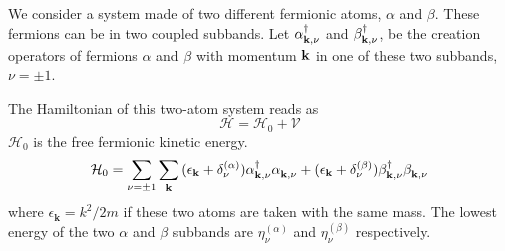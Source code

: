 \documentclass[11pt]{article} %
\begin{document}
We consider a system made of two different fermionic atoms, $\alpha$ and $\beta$.  These fermions can be in two coupled subbands. Let $\alpha^{\dagger}_{\mathbf{k}, \nu}$ and $\beta^{\dagger}_{\mathbf{k},\nu}$, be the creation operators of fermions $\alpha$ and $\beta$ with momentum $\mathbf{k}$ in one of these two subbands, $\nu=\pm1$. 

The Hamiltonian of this two-atom system reads as 
\begin{equation}\label{eq:H}
\mathcal{H}=\mathcal{H}_0+\mathcal{V}
\end{equation}
$\mathcal{H}_0$ is the free fermionic kinetic energy. 	
\begin{equation}
\mathcal{H}_0=\sum_{\nu=\pm1}\sum_{\mathbf{k}}{(\epsilon_{\mathbf{k}}+\delta^{(\alpha)}_{\nu})\alpha^{\dagger}_{\mathbf{k}, \nu}\alpha^{}_{\mathbf{k}, \nu}
+(\epsilon_{\mathbf{k}}+\delta^{(\beta)}_{\nu})\beta^{\dagger}_{\mathbf{k}, \nu}\beta^{}_{\mathbf{k}, \nu}}				
\end{equation}	
where $\epsilon_{\mathbf{k}}=k^2/2m$ if these two atoms are taken with the same mass.  The lowest energy of the two $\alpha$ and $\beta$ subbands are $\eta_{\nu}^{(\alpha)}$ and 	 $\eta_{\nu}^{(\beta)}$ respectively. 
\end{document}
